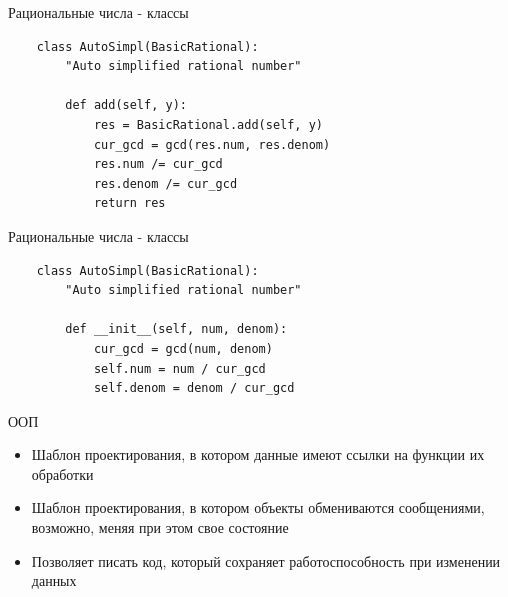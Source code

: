 \documentclass{article}
\begin{document}
\begin{center} Рациональные числа - классы \end{center}
\begin{lstlisting}
    class AutoSimpl(BasicRational):
        "Auto simplified rational number"

        def add(self, y):
            res = BasicRational.add(self, y)
            cur_gcd = gcd(res.num, res.denom)
            res.num /= cur_gcd
            res.denom /= cur_gcd
            return res
\end{lstlisting}
\newpage

\begin{center} Рациональные числа - классы \end{center}
\begin{lstlisting}
    class AutoSimpl(BasicRational):
        "Auto simplified rational number"
    
        def __init__(self, num, denom):
            cur_gcd = gcd(num, denom)
            self.num = num / cur_gcd
            self.denom = denom / cur_gcd
\end{lstlisting}
\newpage

\begin{center} ООП \end{center}
\begin{itemize}
    \item Шаблон проектирования, в котором данные имеют ссылки на функции их обработки
    \item Шаблон проектирования, в котором объекты обмениваются сообщениями, возможно,
          меняя при этом свое состояние
    \item Позволяет писать код, который сохраняет работоспособность при изменении данных
\end{itemize}
\newpage
\end{document}
